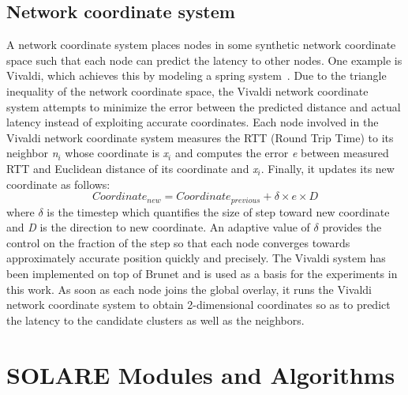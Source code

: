 \subsection{Network coordinate system}
\label{solare:coordinate}
A network coordinate system places nodes in some synthetic network
coordinate space such that each node can predict the latency to other
nodes.
%
One example is Vivaldi, which achieves this by modeling a spring
system~\cite{vivaldi}.
%
Due to the triangle inequality of the network coordinate space, the Vivaldi
network coordinate system attempts to minimize the error between the
predicted distance and actual latency instead of exploiting accurate
coordinates.
%
Each node involved in the Vivaldi network coordinate system measures the RTT
(Round Trip Time) to its neighbor \textit{n$_{i}$} whose coordinate is
\textit{x$_{i}$} and computes the error \textit{e} between measured RTT
and Euclidean distance of its coordinate and \textit{x$_{i}$}.
%
Finally, it updates its new coordinate as follows:
%
\begin{equation}
	\textit{Coordinate$_{new}$} = \textit{Coordinate$_{previous}$} +
\textit{$\delta$} \times \textit{e} \times \textit{D} 
\label{equ:coordinate}
\end{equation}
%
where $\delta$ is the timestep which quantifies the size of step toward
new coordinate and \textit{D} is the direction to new coordinate.
%
An adaptive value of $\delta$ provides the control on the fraction of
the step so that each node converges towards approximately accurate
position quickly and precisely.
%
The Vivaldi system has been implemented on top of Brunet and is used as
a basis for the experiments in this work.
%
As soon as each node joins the global overlay, it runs the Vivaldi
network coordinate system to obtain 2-dimensional coordinates so as to
predict the latency to the candidate clusters as well as the neighbors.
%

\section{SOLARE Modules and Algorithms}
\label{solare:modules}
